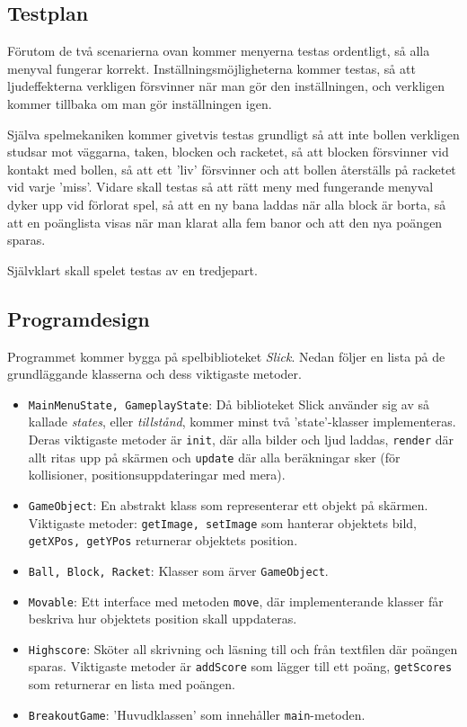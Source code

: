 \documentclass[11pt,a4paper]{article}
\begin{document}
\subsection{Testplan}
Förutom de två scenarierna ovan kommer menyerna testas ordentligt, så alla menyval fungerar korrekt. Inställningsmöjligheterna kommer testas, så att ljudeffekterna verkligen försvinner när man gör den inställningen, och verkligen kommer tillbaka om man gör inställningen igen.

Själva spelmekaniken kommer givetvis testas grundligt så att inte bollen verkligen studsar mot väggarna, taken, blocken och racketet, så att blocken försvinner vid kontakt med bollen, så att ett 'liv' försvinner och att bollen återställs på racketet vid varje 'miss'. Vidare skall testas så att rätt meny med fungerande menyval dyker upp vid förlorat spel, så att en ny bana laddas när alla block är borta, så att en poänglista visas när man klarat alla fem banor och att den nya poängen sparas.

Självklart skall spelet testas av en tredjepart.

\subsection{Programdesign}
Programmet kommer bygga på spelbiblioteket \emph{Slick}. Nedan följer en lista på de grundläggande klasserna och dess viktigaste metoder.

\begin{itemize}
	\item \texttt{MainMenuState, GameplayState}: Då biblioteket Slick använder sig av så kallade \emph{states}, eller \emph{tillstånd}, kommer minst två 'state'-klasser implementeras. Deras viktigaste metoder är \texttt{init}, där alla bilder och ljud laddas, \texttt{render} där allt ritas upp på skärmen och \texttt{update} där alla beräkningar sker (för kollisioner, positionsuppdateringar med mera).
	\item \texttt{GameObject}: En abstrakt klass som representerar ett objekt på skärmen. Viktigaste metoder: \texttt{getImage, setImage} som hanterar objektets bild, \texttt{getXPos, getYPos} returnerar objektets position.
	\item \texttt{Ball, Block, Racket}: Klasser som ärver \texttt{GameObject}.
	\item \texttt{Movable}: Ett interface med metoden \texttt{move}, där implementerande klasser får beskriva hur objektets position skall uppdateras.
	\item \texttt{Highscore}: Sköter all skrivning och läsning till och från textfilen där poängen sparas. Viktigaste metoder är \texttt{addScore} som lägger till ett poäng, \texttt{getScores} som returnerar en lista med poängen.
	\item \texttt{BreakoutGame}: 'Huvudklassen' som innehåller \texttt{main}-metoden.
\end{itemize}
\end{document}
